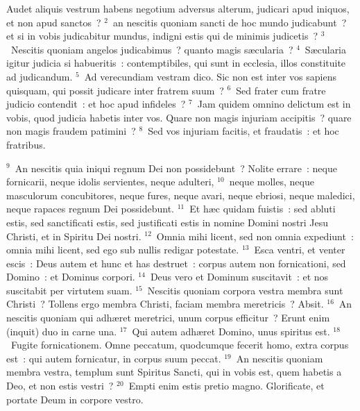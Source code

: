 \lettrine[lines=3,image=true,loversize=0.05,lraise=-0.03]{A}{}udet aliquis vestrum habens negotium adversus alterum, judicari apud iniquos, et non apud sanctos~?
${}^{2}$~an nescitis quoniam sancti de hoc mundo judicabunt~? et si in vobis judicabitur mundus, indigni estis qui de minimis judicetis~?
${}^{3}$~Nescitis quoniam angelos judicabimus~? quanto magis s\ae cularia~?
${}^{4}$~S\ae cularia igitur judicia si habueritis~: contemptibiles, qui sunt in ecclesia, illos constituite ad judicandum.
${}^{5}$~Ad verecundiam vestram dico. Sic non est inter vos sapiens quisquam, qui possit judicare inter fratrem suum~?
${}^{6}$~Sed frater cum fratre judicio contendit~: et hoc apud infideles~?
${}^{7}$~Jam quidem omnino delictum est in vobis, quod judicia habetis inter vos. Quare non magis injuriam accipitis~? quare non magis fraudem patimini~?
${}^{8}$~Sed vos injuriam facitis, et fraudatis~: et hoc fratribus.


${}^{9}$~An nescitis quia iniqui regnum Dei non possidebunt~? Nolite errare~: neque fornicarii, neque idolis servientes, neque adulteri,
${}^{10}$~neque molles, neque masculorum concubitores, neque fures, neque avari, neque ebriosi, neque maledici, neque rapaces regnum Dei possidebunt.
${}^{11}$~Et h\ae c quidam fuistis~: sed abluti estis, sed sanctificati estis, sed justificati estis in nomine Domini nostri Jesu Christi, et in Spiritu Dei nostri.
${}^{12}$~Omnia mihi licent, sed non omnia expediunt~: omnia mihi licent, sed ego sub nullis redigar potestate.
${}^{13}$~Esca ventri, et venter escis~: Deus autem et hunc et has destruet~: corpus autem non fornicationi, sed Domino~: et Dominus corpori.
${}^{14}$~Deus vero et Dominum suscitavit~: et nos suscitabit per virtutem suam.
${}^{15}$~Nescitis quoniam corpora vestra membra sunt Christi~? Tollens ergo membra Christi, faciam membra meretricis~? Absit.
${}^{16}$~An nescitis quoniam qui adh\ae ret meretrici, unum corpus efficitur~? Erunt enim (inquit) duo in carne una.
${}^{17}$~Qui autem adh\ae ret Domino, unus spiritus est.
${}^{18}$~Fugite fornicationem. Omne peccatum, quodcumque fecerit homo, extra corpus est~: qui autem fornicatur, in corpus suum peccat.
${}^{19}$~An nescitis quoniam membra vestra, templum sunt Spiritus Sancti, qui in vobis est, quem habetis a Deo, et non estis vestri~?
${}^{20}$~Empti enim estis pretio magno. Glorificate, et portate Deum in corpore vestro.

